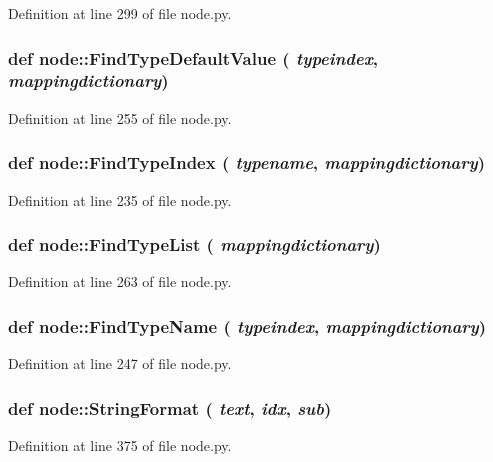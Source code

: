 Definition at line 299 of file node.py.\hypertarget{namespacenode_5165d2e252cbc529a9b477f2356f7554}{
\subsubsection[FindTypeDefaultValue]{\setlength{\rightskip}{0pt plus 5cm}def node::Find\-Type\-Default\-Value ( {\em typeindex},  {\em mappingdictionary})}}
\label{namespacenode_5165d2e252cbc529a9b477f2356f7554}




Definition at line 255 of file node.py.\hypertarget{namespacenode_251f8d2fab99af17a69618eb9a9aa01d}{
\subsubsection[FindTypeIndex]{\setlength{\rightskip}{0pt plus 5cm}def node::Find\-Type\-Index ( {\em typename},  {\em mappingdictionary})}}
\label{namespacenode_251f8d2fab99af17a69618eb9a9aa01d}




Definition at line 235 of file node.py.\hypertarget{namespacenode_b275546f2219df55852ad6f1f5cc7a4c}{
\subsubsection[FindTypeList]{\setlength{\rightskip}{0pt plus 5cm}def node::Find\-Type\-List ( {\em mappingdictionary})}}
\label{namespacenode_b275546f2219df55852ad6f1f5cc7a4c}




Definition at line 263 of file node.py.\hypertarget{namespacenode_ec2e771eabdaed0591645766a7979000}{
\subsubsection[FindTypeName]{\setlength{\rightskip}{0pt plus 5cm}def node::Find\-Type\-Name ( {\em typeindex},  {\em mappingdictionary})}}
\label{namespacenode_ec2e771eabdaed0591645766a7979000}




Definition at line 247 of file node.py.\hypertarget{namespacenode_8744929d28d5a0e9e9c6f2d7a75a5df2}{
\subsubsection[StringFormat]{\setlength{\rightskip}{0pt plus 5cm}def node::String\-Format ( {\em text},  {\em idx},  {\em sub})}}
\label{namespacenode_8744929d28d5a0e9e9c6f2d7a75a5df2}




Definition at line 375 of file node.py.
